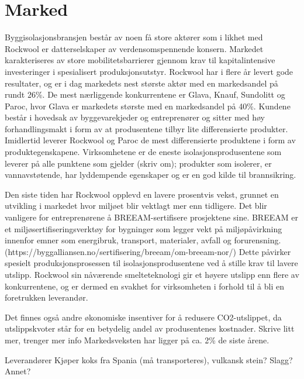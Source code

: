 \section{Marked}  
Byggisolasjonsbransjen består av noen få store aktører som i likhet med Rockwool er datterselskaper av verdensomspennende konsern. Markedet karakteriseres av store mobilitetsbarrierer gjennom krav til kapitalintensive investeringer i spesialisert produksjonsutstyr. Rockwool har i flere år levert gode resultater, og er i dag markedets nest største aktør med en markedsandel på rundt 26\%. De mest nærliggende konkurrentene er Glava, Knauf, Sundolitt og Paroc, hvor Glava er markedets største med en markedsandel på 40\%. Kundene består i hovedsak av byggevarekjeder og entreprenører og sitter med høy forhandlingsmakt i form av at produsentene tilbyr lite differensierte produkter. Imidlertid leverer Rockwool og Paroc de mest differensierte produktene i form av produktegenskapene. Virksomhetene er de eneste isolasjonsprodusentene som leverer på alle punktene som gjelder (skriv om); produkter som isolerer, er vannavstøtende, har lyddempende egenskaper og er en god kilde til brannsikring. 

\indent \newline
Den siste tiden har Rockwool opplevd en lavere prosentvis vekst, grunnet en utvikling i markedet hvor miljøet blir vektlagt mer enn tidligere. Det blir vanligere for entreprenørene å BREEAM-sertifisere prosjektene sine. BREEAM er et miljøsertifiseringsverktøy for bygninger som legger vekt på miljøpåvirkning innenfor emner som energibruk, transport, materialer, avfall og forurensning. (https://byggalliansen.no/sertifisering/breeam/om-breeam-nor/) Dette påvirker spesielt produksjonsprosessen til isolasjonsprodusentene ved å stille krav til lavere utslipp. Rockwool sin nåværende smelteteknologi gir et høyere utslipp enn flere av konkurrentene, og er dermed en svakhet for virksomheten i forhold til å bli en foretrukken leverandør. 

\indent \newline
Det finnes også andre økonomiske insentiver for å redusere CO2-utslippet, da utslippskvoter står for en betydelig andel av produsentenes kostnader. Skrive litt mer, trenger mer info 
Markedsveksten har ligger på ca. 2\% de siste årene.

\indent \newline
Leverandører 
Kjøper koks fra Spania (må transporteres), vulkansk stein? Slagg? Annet?

